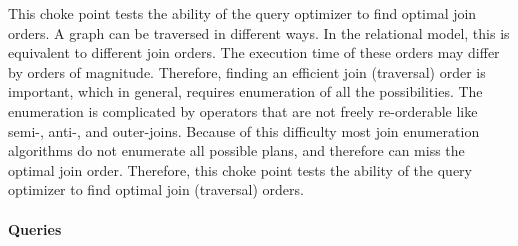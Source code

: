 
This choke point tests the ability of the query optimizer to find optimal join orders. A graph can be traversed in different ways. In the relational model, this is equivalent to different join orders.
The execution time of these orders may differ by orders of magnitude. Therefore, finding an efficient join (traversal) order is important, which in general, requires enumeration of all the possibilities.
The enumeration is complicated by operators that are not freely re-orderable like semi-, \mbox{anti-,} and outer-joins. Because of this difficulty most join enumeration algorithms do not enumerate all possible plans, and therefore can miss the optimal join order. Therefore, this choke point tests the ability of the query optimizer to find optimal join (traversal) orders.


\paragraph{Queries}
{\raggedright

}